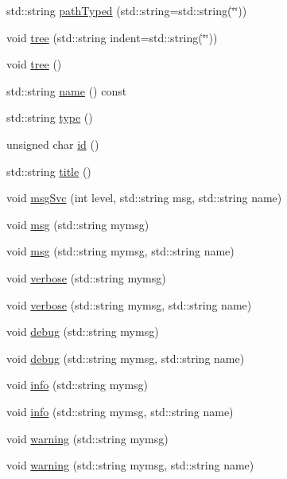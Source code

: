 \begin{DoxyCompactItemize}
\item 
std::string \hyperlink{classHierarchy_a1efd56cd164d328d2002e53a10a19b8c}{pathTyped} (std::string=std::string(\char`\"{}\char`\"{}))
\item 
void \hyperlink{classHierarchy_a76e914b9a677a22a82deb74d892bf261}{tree} (std::string indent=std::string(\char`\"{}\char`\"{}))
\item 
void \hyperlink{classHierarchy_a594c294c5f60c230e106d522ed008212}{tree} ()
\item 
std::string \hyperlink{classObject_a975e888d50bfcbffda2c86368332a5cd}{name} () const 
\item 
std::string \hyperlink{classObject_a84f99f70f144a83e1582d1d0f84e4e62}{type} ()
\item 
unsigned char \hyperlink{classObject_af99145335cc61ff6e2798ea17db009d2}{id} ()
\item 
std::string \hyperlink{classObject_a73a0f1a41828fdd8303dd662446fb6c3}{title} ()
\item 
void \hyperlink{classObject_a3f9d5537ebce0c0f2bf6ae4d92426f3c}{msgSvc} (int level, std::string msg, std::string name)
\item 
void \hyperlink{classObject_a58b2d0618c2d08cf2383012611528d97}{msg} (std::string mymsg)
\item 
void \hyperlink{classObject_ac5d59299273cee27aacf7de00d2e7034}{msg} (std::string mymsg, std::string name)
\item 
void \hyperlink{classObject_a83d2db2df682907ea1115ad721c1c4a1}{verbose} (std::string mymsg)
\item 
void \hyperlink{classObject_a2d4120195317e2a3c6532e8bb9f3da68}{verbose} (std::string mymsg, std::string name)
\item 
void \hyperlink{classObject_aac010553f022165573714b7014a15f0d}{debug} (std::string mymsg)
\item 
void \hyperlink{classObject_a6c9a0397ca804e04d675ed05683f5420}{debug} (std::string mymsg, std::string name)
\item 
void \hyperlink{classObject_a644fd329ea4cb85f54fa6846484b84a8}{info} (std::string mymsg)
\item 
void \hyperlink{classObject_a1ca123253dfd30fc28b156f521dcbdae}{info} (std::string mymsg, std::string name)
\item 
void \hyperlink{classObject_a65cd4fda577711660821fd2cd5a3b4c9}{warning} (std::string mymsg)
\item 
void \hyperlink{classObject_a11f101db4dd73d9391b0231818881d86}{warning} (std::string mymsg, std::string name)

\end{DoxyCompactItemize}
